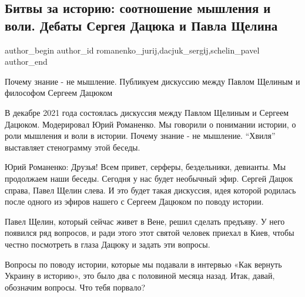  
 
 
 
 
\subsection{Битвы за историю: соотношение мышления и воли. Дебаты Сергея Дацюка и Павла Щелина}
\label{sec:19_01_2022.stz.news.ua.hvylya.1.bitvy_za_istoriu}

\ifcmt
 author_begin
   author_id romanenko_jurij,dacjuk_sergіj,schelin_pavel
 author_end
\fi

\begin{zznagolos}
Почему знание - не мышление. Публикуем дискуссию между Павлом Щелиным и философом Сергеем Дацюком
\end{zznagolos}

В декабре 2021 года состоялась дискуссия между Павлом Щелиным и Сергеем
Дацюком. Модерировал Юрий Романенко. Мы говорили о понимании истории, о роли
мышления и воли в истории. Почему знание - не мышление. \enquote{Хвиля} выставляет
стенограмму этой беседы. 

\begin{zzquote}
Юрий Романенко: Друзья! Всем привет, серферы, бездельники, девианты. Мы
продолжаем наши беседы. Сегодня у нас будет необычный эфир. Сергей Дацюк
справа, Павел Щелин слева. И это будет такая дискуссия, идея которой родилась
после одного из эфиров нашего с Сергеем Дацюком по поводу истории.

Павел Щелин, который сейчас живет в Вене, решил сделать предъяву. У него
появился ряд вопросов, и ради этого этот святой человек приехал в Киев, чтобы
честно посмотреть в глаза Дацюку и задать эти вопросы.

Вопросы по поводу истории, которые мы подавали в интервью «Как вернуть Украину
в историю», это было два с половиной месяца назад. Итак, давай, обозначим
вопросы. Что тебя порвало? 
\end{zzquote}

